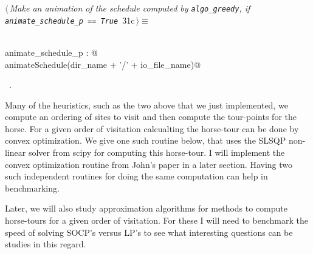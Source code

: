 \documentclass[11.5pt]{report}
\begin{document}
\vspace{-0.8cm} \newchunk
\begin{flushleft} \small
\begin{minipage}{\linewidth}\label{scrap41}\raggedright\small
{} $\langle\,${\itshape Make an animation of the schedule computed by \verb|algo_greedy|, if \verb|animate_schedule_p == True|}\nobreak\ {\footnotesize {31c}}$\,\rangle\equiv$
\vspace{-1ex}
\begin{list}{}{} \item
\mbox{}\verb@@\\
\mbox{}\verb@if animate_schedule_p : @\\
\mbox{}\verb@     animateSchedule(dir_name + '/' + io_file_name)@\\
\mbox{}\verb@@{\NWsep}
\end{list}
\vspace{-1.5ex}
\footnotesize
\begin{list}{}{\setlength{\itemsep}{-\parsep}\setlength{\itemindent}{-\leftmargin}}
\item \NWtxtMacroRefIn\ .

\item{}
\end{list}
\end{minipage}\vspace{4ex}
\end{flushleft}










\vspace{-0.8cm} \newchunk Many of the heuristics, such as the two above that we just implemented, we compute an ordering of sites to visit
and then compute the tour-points for the horse. For a given order of visitation calcualting the horse-tour can be done by convex 
optimization. We give one such routine below, that uses the SLSQP non-linear solver from scipy for computing this horse-tour. I will 
implement the convex optimization routine from John's paper in a later section. Having two such independent routines for doing the same 
computation can help in benchmarking. 

Later, we will also study approximation algorithms for methods to compute horse-tours for a given order of visitation. For these I will need 
to benchmark the speed of solving SOCP's versus LP's to see what interesting questions can be studies in this regard. 
\end{document}
